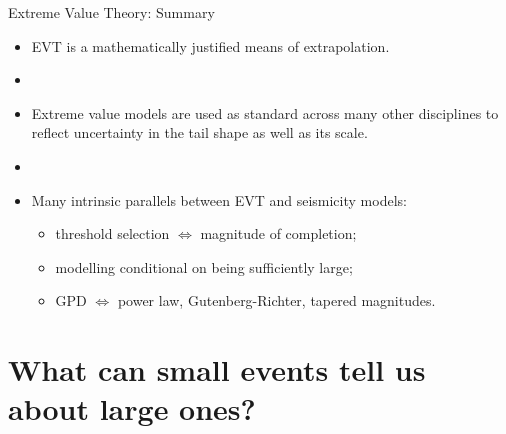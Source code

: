 \begin{frame}{Extreme Value Theory: Summary}
\begin{itemize}
    \item EVT is a mathematically justified means of extrapolation.
    \item []
    \item Extreme value models are used as standard across many other disciplines to reflect uncertainty in the tail shape as well as its scale.
    \item []
    \item Many intrinsic parallels between EVT and seismicity models:
    \begin{itemize}
        \item threshold selection $\iff$ magnitude of completion;
        \item modelling conditional on being sufficiently large;
        \item GPD $\iff$ power law, Gutenberg-Richter, tapered magnitudes.
    \end{itemize}
\end{itemize}

\end{frame}

\section{What can small events tell us about large ones?}



